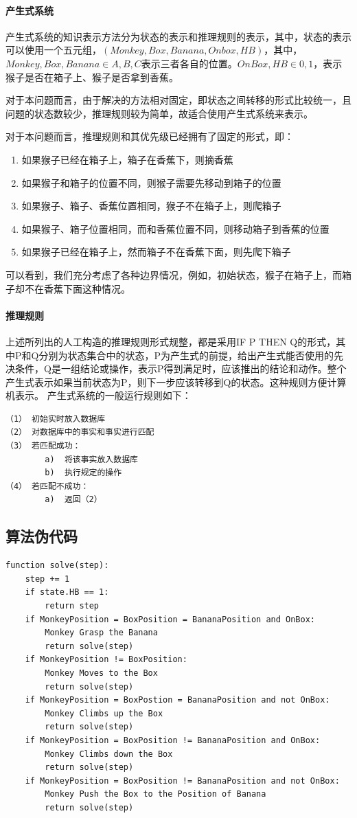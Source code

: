 \paragraph{产生式系统} 产生式系统的知识表示方法分为状态的表示和推理规则的表示，其中，状态的表示可以使用一个五元组，$(Monkey, Box, Banana, Onbox, HB)$，其中，$Monkey, Box, Banana \in {A,B,C}$表示三者各自的位置。$OnBox,HB \in {0,1}$，表示猴子是否在箱子上、猴子是否拿到香蕉。
\par 对于本问题而言，由于解决的方法相对固定，即状态之间转移的形式比较统一，且问题的状态数较少，推理规则较为简单，故适合使用产生式系统来表示。
\par 对于本问题而言，推理规则和其优先级已经拥有了固定的形式，即：
\begin{enumerate}
  \item 如果猴子已经在箱子上，箱子在香蕉下，则摘香蕉
  \item 如果猴子和箱子的位置不同，则猴子需要先移动到箱子的位置
  \item 如果猴子、箱子、香蕉位置相同，猴子不在箱子上，则爬箱子
  \item 如果猴子、箱子位置相同，而和香蕉位置不同，则移动箱子到香蕉的位置
  \item 如果猴子已经在箱子上，然而箱子不在香蕉下面，则先爬下箱子
\end{enumerate}
\par 可以看到，我们充分考虑了各种边界情况，例如，初始状态，猴子在箱子上，而箱子却不在香蕉下面这种情况。
\paragraph{推理规则} 上述所列出的人工构造的推理规则形式规整，都是采用IF P THEN Q的形式，其中P和Q分别为状态集合中的状态，P为产生式的前提，给出产生式能否使用的先决条件，Q是一组结论或操作，表示P得到满足时，应该推出的结论和动作。整个产生式表示如果当前状态为P，则下一步应该转移到Q的状态。这种规则方便计算机表示。
产生式系统的一般运行规则如下：
\begin{lstlisting}
（1）	初始实时放入数据库
（2）	对数据库中的事实和事实进行匹配
（3）	若匹配成功：
        a)	将该事实放入数据库
        b)	执行规定的操作
（4）	若匹配不成功：
        a)	返回（2）
\end{lstlisting}


\subsection{算法伪代码}
\begin{lstlisting}
function solve(step):
    step += 1
    if state.HB == 1:
        return step
    if MonkeyPosition = BoxPosition = BananaPosition and OnBox:
        Monkey Grasp the Banana
        return solve(step)
    if MonkeyPosition != BoxPosition:
        Monkey Moves to the Box
        return solve(step)
    if MonkeyPosition = BoxPostion = BananaPosition and not OnBox:
        Monkey Climbs up the Box
        return solve(step)
    if MonkeyPosition = BoxPosition != BananaPosition and OnBox:
        Monkey Climbs down the Box
        return solve(step)
    if MonkeyPosition = BoxPosition != BananaPosition and not OnBox:
        Monkey Push the Box to the Position of Banana
        return solve(step)
\end{lstlisting}
